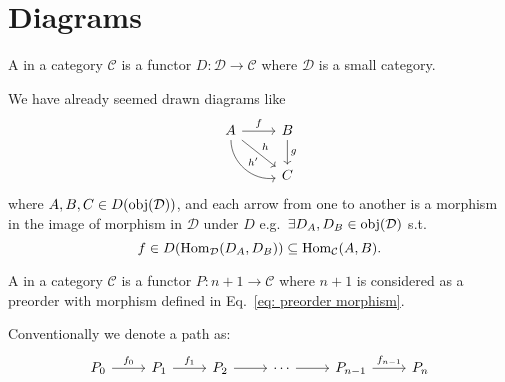 \documentclass[openany, a5paper]{book}
\begin{document}
\section{Diagrams}
\begin{definition}[Diagram]
	A  in a category $\mathcal C$ is a functor $D \colon \mathcal D \to \mathcal C$ where $\mathcal D$ is a small category.
\end{definition}

We have already seemed drawn diagrams like
\begin{equation}
\begin{tikzcd}
	A \arrow[r, "f"] \arrow[rd, "h"] \arrow[rd, "h'", bend right=49] & B \arrow[d, "g"] \\
																	 & C               
\end{tikzcd}
\end{equation}
where $A, B, C \in D(\operatorname{obj}(\mathcal D))$, and each arrow from one to another is a morphism in the image of morphism in $\mathcal D$ under $D$ e.g.\ $\exists D_A, D_B \in \operatorname{obj}(\mathcal D)$ s.t.\ 
\begin{equation}
	f \in D(\operatorname{Hom}_{\mathcal D}(D_A, D_B)) \subseteq \operatorname{Hom}_{\mathcal C}(A, B).
\end{equation}

\begin{definition}[Path]
	A  in a category $\mathcal C$ is a functor $P \colon n + 1 \to \mathcal C$ where $n + 1$ is considered as a preorder with morphism defined in Eq.~\eqref{eq: preorder morphism}.  
\end{definition}

Conventionally we denote a path as:
\begin{equation}
\begin{tikzcd}
	P_0 \arrow[r, "f_0"] & P_1 \arrow[r, "f_1"] & P_2 \arrow[r] & \cdots \arrow[r] & P_{n-1} \arrow[r, "f_{n-1}"] & P_n
	\end{tikzcd}
\end{equation}
\end{document}
